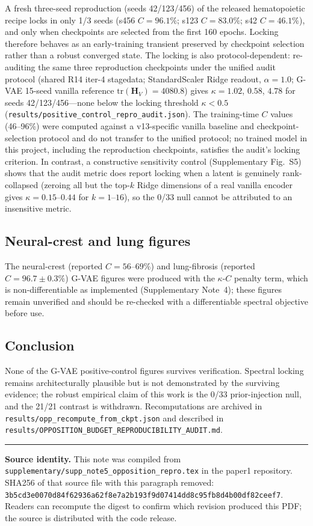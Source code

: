 \documentclass[11pt,a4paper]{article}
\newcommand{\Hmat}{\mathbf{H}}
\begin{document}
A fresh three-seed reproduction (seeds 42/123/456) of the released hematopoietic recipe locks in only 1/3 seeds (s456 $C=96.1\%$; s123 $C=83.0\%$; s42 $C=46.1\%$), and only when checkpoints are selected from the first 160 epochs. Locking therefore behaves as an early-training transient preserved by checkpoint selection rather than a robust converged state. The locking is also protocol-dependent: re-auditing the same three reproduction checkpoints under the unified audit protocol (shared R14 iter-4 stagedata; StandardScaler Ridge readout, $\alpha=1.0$; G-VAE 15-seed vanilla reference $\mathrm{tr}(\Hmat_V)=4080.8$) gives $\kappa=1.02$, $0.58$, $4.78$ for seeds 42/123/456---none below the locking threshold $\kappa<0.5$ (\texttt{results/positive\_control\_repro\_audit.json}). The training-time $C$ values (46--96\%) were computed against a v13-specific vanilla baseline and checkpoint-selection protocol and do not transfer to the unified protocol; no trained model in this project, including the reproduction checkpoints, satisfies the audit's locking criterion. In contrast, a constructive sensitivity control (Supplementary Fig.~S5) shows that the audit metric does report locking when a latent is genuinely rank-collapsed (zeroing all but the top-$k$ Ridge dimensions of a real vanilla encoder gives $\kappa=0.15$--$0.44$ for $k=1$--$16$), so the 0/33 null cannot be attributed to an insensitive metric.

\subsection*{Neural-crest and lung figures}

The neural-crest (reported $C=56$--$69\%$) and lung-fibrosis (reported $C=96.7\pm0.3\%$) G-VAE figures were produced with the $\kappa$-$C$ penalty term, which is non-differentiable as implemented (Supplementary Note~4); these figures remain unverified and should be re-checked with a differentiable spectral objective before use.

\subsection*{Conclusion}

None of the G-VAE positive-control figures survives verification. Spectral locking remains architecturally plausible but is not demonstrated by the surviving evidence; the robust empirical claim of this work is the 0/33 prior-injection null, and the 21/21 contrast is withdrawn. Recomputations are archived in \texttt{results/opp\_recompute\_from\_ckpt.json} and described in \texttt{results/OPPOSITION\_BUDGET\_REPRODUCIBILITY\_AUDIT.md}.

\vspace{10pt}
\noindent\rule{\textwidth}{0.4pt}
\footnotesize\textbf{Source identity.} This note was compiled from \texttt{supplementary/supp\_note5\_opposition\_repro.tex} in the paper1 repository. SHA256 of that source file with this paragraph removed: \texttt{3b5cd3e0070d84f62936a62f8e7a2b193f9d07414dd8c95fb8d4b00df82ceef7}. Readers can recompute the digest to confirm which revision produced this PDF; the source is distributed with the code release.
\end{document}
